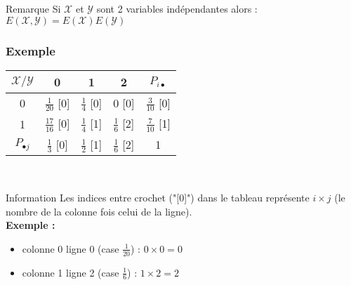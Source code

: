 \documentclass[a4paper, 12pt]{article}
\begin{document}
\begin{remarque}{Remarque}
Si $\mathcal{X}$ et $\mathcal{Y}$ sont 2 variables indépendantes alors : $E(\mathcal{X, Y}) = E(\mathcal{X}) E(\mathcal{Y})$
\end{remarque}



\subsubsection*{Exemple}
{\Large
\begin{center}
\begin{tabular}{c|ccc|c}
	$\mathcal{X/Y}$ & 0 & 1 & 2 & $P_{i \bullet}$ \\
	\hline
	0 & $\frac{1}{20}$ \tiny{[0]} & $\frac{1}{4}$ \tiny{[0]} & 0 \tiny{[0]} & $\frac{3}{10}$ \tiny{[0]} \\
	1 & $\frac{17}{16}$ \tiny{[0]} & $\frac{1}{4}$ \tiny{[1]} & $\frac{1}{6}$ \tiny{[2]} & $\frac{7}{10}$ \tiny{[1]} \\
	\hline
	$P_{\bullet j}$ & $\frac{1}{3}$ \tiny{[0]} & $\frac{1}{2}$ \tiny{[1]} & $\frac{1}{6}$ \tiny{[2]} & 1\\
\end{tabular}\\
\end{center}
}

\begin{info}{Information}
Les indices entre crochet ("[0]") dans le tableau représente $i \times j$ (le nombre de la colonne fois celui de la ligne).\\
\textbf{Exemple :}
\begin{itemize}
\item colonne 0 ligne 0 (case $\frac{1}{20}$) : $0 \times 0 = 0$
\item colonne 1 ligne 2 (case $\frac{1}{6}$) : $1 \times 2 = 2$
\end{itemize}
\end{info}
\end{document}
